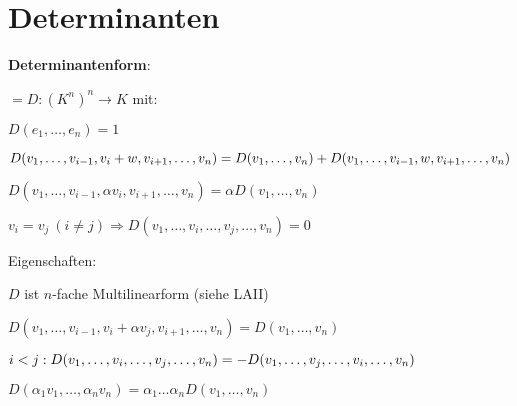 \section{\label{sec:Determinanten}Determinanten}

\textbf{Determinantenform}:
\begin{items}
	\item $=D:{(K^n)}^n \rightarrow K$ mit:
	\begin{enumeration}
		\item $D(e_1,\dots,e_n) = 1$
		\item $D(v_1, \dots, v_{i-1}, v_i+w, v_{i+1}, \dots, v_n) \\* = D(v_1,\dots,v_n)+D(v_1, \dots, v_{i-1}, w, v_{i+1}, \dots, v_n)$
		\item $D(v_1, \dots, v_{i-1}, \alpha v_i, v_{i+1}, \dots, v_n) = \alpha D(v_1, \dots, v_n)$
		\item $v_i=v_j \ (i \neq j) \Rightarrow D(v_1, \dots, v_i, \dots, v_j, \dots, v_n) = 0$
	\end{enumeration}
	\item Eigenschaften:
	\begin{enumeration}
		\item $D$ ist $n$-fache Multilinearform (siehe LAII)
		\item $D(v_1, \dots, v_{i-1}, v_i + \alpha v_j, v_{i+1}, \dots, v_n) =D(v_1, \dots, v_n)$
		\item $i<j: D(v_1, \dots, v_i, \dots, v_j, \dots, v_n) \\* = - D(v_1, \dots, v_j, \dots, v_i, \dots, v_n)$
		\item $D(\alpha_1 v_1, \dots, \alpha_n v_n) = \alpha_1 \dots \alpha_n D(v_1, \dots, v_n)$
	\end{enumeration}
\end{items}

\newpage

